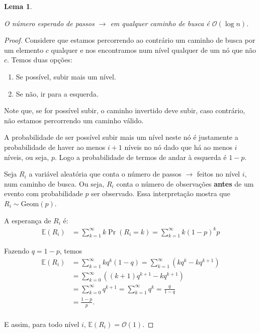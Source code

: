 \documentclass[paper=a4, fontsize=11pt]{scrartcl} %
\newtheorem{lemma}[theorem]{Lema}
\numberwithin{equation}{section}
\numberwithin{figure}{section}
\numberwithin{table}{section}
\numberwithin{definition}{section}
\numberwithin{theorem}{section}
\numberwithin{property}{section}
\numberwithin{proposition}{section}
\newcommand{\cO}{\ensuremath{\mathcal{O}}}
\newcommand{\Exp}{\ensuremath{{\mathbb{E}}}\xspace}
\begin{document}
\begin{lemma} \label{lemma:rightarrow}

O número esperado de passos $\rightarrow$ em qualquer caminho de busca é $\cO(\log n)$.

\end{lemma}

\begin{proof}
Considere que estamos percorrendo ao contrário um caminho de busca por um elemento $c$ qualquer 
e nos encontramos num nível qualquer de um nó que não $c$. Temos duas opções:
\begin{enumerate}[noitemsep]
  \item Se possível, subir mais um nível. 
  \item Se não, ir para a esquerda.
\end{enumerate}

Note que, se for possível subir, o caminho invertido deve subir, caso contrário, não estamos percorrendo um 
caminho válido.

A probabilidade de ser possível subir mais um nível neste nó é justamente a probabilidade de haver ao menos
$i + 1$ níveis no nó dado que há ao menos $i$ níveis, ou seja, $p$. Logo a probabilidade de termos de andar à
esquerda é $1 - p$.

Seja $R_i$ a variável aleatória que conta o número de passos $\rightarrow$ feitos no nível $i$, num 
caminho de busca. Ou seja, $R_i$ conta o número de observações \textbf{antes} de um evento com probabilidade 
$p$ ser observado. Essa interpretação mostra que $R_i \sim \text{Geom}(p)$. 

A esperança de $R_i$ é:
\begin{align*}
\Exp(R_i)
  &= \sum_{k = 1}^{\infty} k \Pr(R_i = k)= \sum_{k = 1}^{\infty} k (1 - p)^{k} p 
\end{align*}

Fazendo  $q = 1 - p$, temos
\begin{align*}
\Exp(R_i)
  &= \sum_{k = 1}^{\infty} k q^{k} (1 - q) 
    = \sum_{k = 1}^{\infty} \left( k q^{k}  - k q^{k+1} \right)  \\
  &= \sum_{k = 0}^{\infty} \left( (k+1) q^{k+1}  - k q^{k+1} \right) \\
  &= \sum_{k = 0}^{\infty} q^{k+1} 
    = \sum_{k = 1}^{\infty} q^{k}  
    = \frac{q}{1-q} \\
  &= \frac{1 - p}{p}. \\
\end{align*}

E assim, para todo nível $i$, $\Exp(R_i) = \cO(1)$.


\end{proof}
\end{document}
